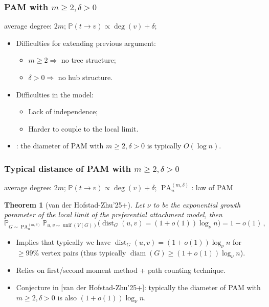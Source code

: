 \documentclass{beamer}
\theoremstyle{plain}
\newtheorem{thm}{Theorem}
\theoremstyle{definition}
\begin{document}
\begin{frame}
\frametitle{PAM with $m\geq 2,\delta>0$}
\quad average degree: $2m$; \quad\quad $\mathbb P(t\to v)\varpropto \operatorname{deg}(v)+\delta$; 
\begin{itemize}
    \item \pause Difficulties for extending previous argument:
    \begin{itemize}
        \item \pause $m\geq 2 \Longrightarrow$ no tree structure;
        \item \pause $\delta>0 \Longrightarrow$ no hub structure.
    \end{itemize}
    \item \pause Difficulties in the model:
    \begin{itemize}
        \item \pause Lack of independence;
        \item \pause Harder to couple to the local limit.
    \end{itemize}
    \item {}: the diameter of PAM with $m\geq 2,\delta>0$ is typically $O(\log n)$. 
\end{itemize}
\end{frame}





\begin{frame}
\frametitle{Typical distance of PAM with $m\geq 2,\delta>0$}
average degree: $2m$; \quad $\mathbb P(t\to v)\varpropto \operatorname{deg}(v)+\delta$; \quad $\operatorname{PA}^{(m,\delta)}_n$: law of PAM
\begin{thm}[van der Hofstad-Zhu'25+]
    Let $\nu$ to be the exponential growth parameter of the local limit of the preferential attachment model, then
    \[
        \mathbb P_{G \sim \operatorname{PA}^{(m,\delta)}_n} \mathbb P_{u,v \sim \operatorname{unif}(V(G))}\big( \operatorname{dist}_G(u,v)=(1+o(1))\log_\nu n \big) = 1-o(1) \,,
    \] 
\end{thm}
\begin{itemize}
    \item \pause Implies that typically we have $\operatorname{dist}_G(u,v)=(1+o(1))\log_\nu n$ for $\geq 99\%$ vertex pairs (thus typically $\operatorname{diam}(G)\geq (1+o(1))\log_\nu n$).
    \item \pause Relies on first/second moment method + path counting technique.
    \item \pause Conjecture in {\color{rgr}[van der Hofstad-Zhu'25+]}: typically the diameter of PAM with $m\geq 2,\delta>0$ is also $(1+o(1))\log_{\nu} n$.
\end{itemize}
\end{frame}
\end{document}
